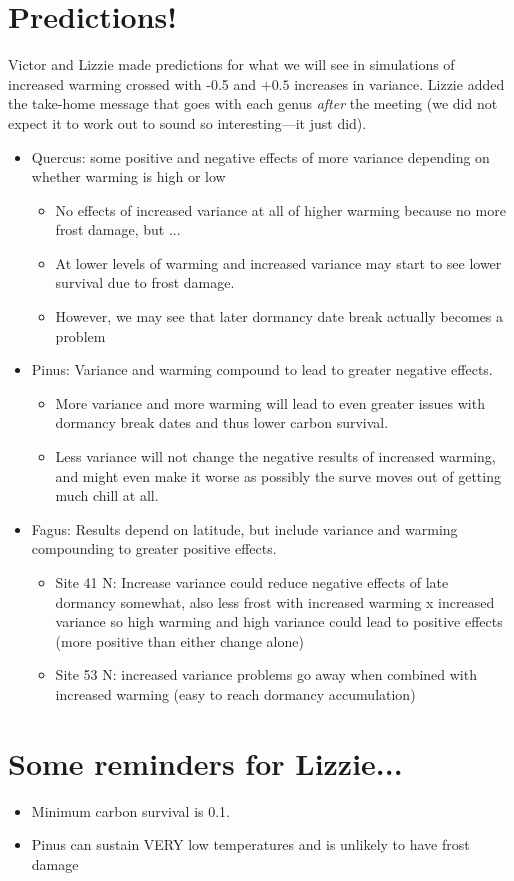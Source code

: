 \documentclass[11pt,letter]{article}
\begin{document}
\section{Predictions!}

Victor and Lizzie made predictions for what we will see in simulations of increased warming crossed with -0.5 and $+0.5$ increases in variance. Lizzie added the take-home message that goes with each genus \emph{after} the meeting (we did not expect it to work out to sound so interesting---it just did). 

\begin{itemize}
\item Quercus: some positive and negative effects of more variance depending on whether warming is high or low
\begin{itemize}
\item No effects of increased variance at all of higher warming because no more frost damage, but ...
\item At lower levels of warming and increased variance may start to see lower survival due to frost damage. 
\item However, we may see that later dormancy date break actually becomes a problem %
\end{itemize}
\item Pinus: Variance and warming compound to lead to greater negative effects. 
\begin{itemize}
\item More variance and more warming will lead to even greater issues with dormancy break dates and thus lower carbon survival. 
\item Less variance will not change the negative results of increased warming, and might even make it worse as possibly the surve moves out of getting much chill at all. 
\end{itemize}
\item Fagus: Results depend on latitude, but include variance and warming compounding to greater positive effects. 
\begin{itemize}
\item Site 41 N: Increase variance could reduce negative effects of late dormancy somewhat, also less frost with increased warming x increased variance so high warming and high variance could lead to positive effects (more positive than either change alone)
\item Site 53 N: increased variance problems go away when combined with increased warming (easy to reach dormancy accumulation)
\end{itemize}
\end{itemize}

\newpage
\section{Some reminders for Lizzie... }
\begin{itemize}
\item Minimum carbon survival is 0.1. 
\item Pinus can sustain VERY low temperatures and is unlikely to have frost damage
\end{itemize}
\end{document}
